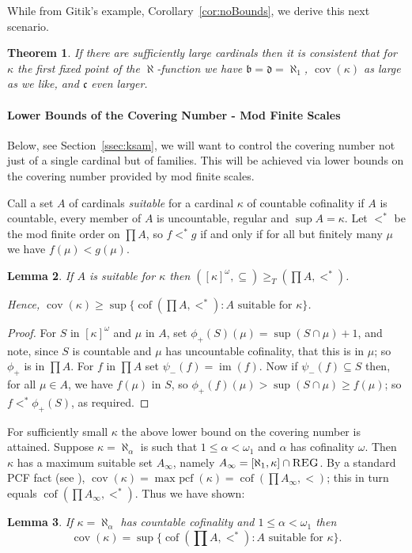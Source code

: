 \documentclass{article}
\newtheorem{thm}{Theorem}[section]
\newtheorem{lem}[thm]{Lemma}
\newcommand{\tq}{\ge_T}
\DeclareMathOperator{\cof}{cof}
\begin{document}
While from Gitik's example, Corollary~\ref{cor:noBounds}, we derive this next scenario.
\begin{thm}\label{th:sam_of_1st_fixpt}
    If there are sufficiently large cardinals then it is consistent that for $\kappa$ the first fixed point of the $\aleph$-function we have $\mathfrak{b}=\mathfrak{d}=\aleph_1$,  $\mathop{cov}(\kappa)$ as large as we like, and $\mathfrak{c}$ even larger.
\end{thm}

\paragraph{Lower Bounds of the Covering Number - Mod Finite  Scales} Below, see Section~\ref{ssec:ksam}, we will want to control the covering number not just of a single cardinal but of families. This will be achieved via lower bounds on the covering number provided by mod finite scales. 

Call a set $A$ of cardinals \emph{suitable} for a cardinal $\kappa$ of countable cofinality if $A$ is countable, every member of $A$ is uncountable, regular and $\sup A=\kappa$.
 Let $<^*$ be the mod finite order on $\prod A$, so $f<^*g$ if and only if for all but finitely many $\mu$ we have $f(\mu)<g(\mu)$.

 \begin{lem}\label{l:suitable}
     If $A$ is suitable for $\kappa$ then $([\kappa]^\omega,\subseteq) \tq (\prod A,<^*)$. 

     Hence, $\mathop{cov}(\kappa) \ge \sup \{\cof\left(\prod A,<^*\right) :A \text{ suitable for }\kappa\}$.
 \end{lem}
\begin{proof}
    For $S$ in $[\kappa]^\omega$ and $\mu$ in $A$, set $\phi_+(S)(\mu)=\sup (S \cap \mu)+1$, and note, since $S$ is countable and $\mu$ has uncountable cofinality, that this is in $\mu$; so $\phi_+$ is in $\prod A$. For $f$ in $\prod A$ set $\psi_-(f)=\mathop{im}(f)$. 
    Now if $\psi_-(f) \subseteq S$ then, for all $\mu \in A$, we have $f(\mu)$ in $S$, so $\phi_+(f)(\mu) > \sup (S \cap \mu) \ge f(\mu)$; so $f <^* \phi_+(S)$, as required.
\end{proof}

For sufficiently small $\kappa$ the above lower bound on the covering number is attained. Suppose $\kappa=\aleph_\alpha$ is such that $1 \le \alpha < \omega_1$ and $\alpha$ has cofinality $\omega$.  Then $\kappa$ has a maximum suitable set $A_\infty$, namely $A_\infty=[\aleph_1,\kappa] \cap \textsc{REG}$. By a standard \textsc{PCF} fact (see \cite{AbrahamMagidor}), $\mathop{cov}(\kappa)=\mathop{max\  pcf}(\kappa)=\cof(\prod A_\infty,<)$; this in turn equals $\cof(\prod A_\infty,<^*)$. Thus we have shown:
\begin{lem}
    If $\kappa=\aleph_\alpha$ has  countable cofinality and $1 \le \alpha < \omega_1$ then 
    \[ \mathop{cov}(\kappa) = \sup \{\cof\left(\prod A,<^*\right) :A \text{ suitable for }\kappa\}.\]
\end{lem}
 
\end{document}
